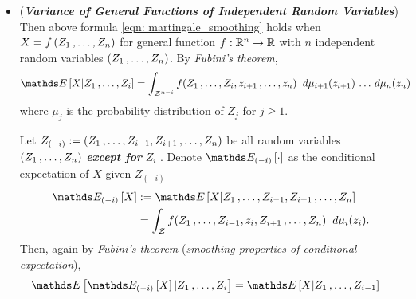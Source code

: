 \documentclass[11pt]{article}
\begin{document}
\begin{itemize}
\item \begin{remark}(\textbf{\emph{Variance of General Functions of Independent Random Variables}})\\
Then above formula \eqref{eqn: martingale_smoothing} holds when $X = f\left(Z_1 \,{,}\ldots{,}\, Z_n\right)$ for general function $f: {\mathbb R}^n \to {\mathbb R}$ with $n$ independent random variables $(Z_1 \,{,}\ldots{,}\, Z_n)$. By \emph{Fubini's theorem},
\begin{align*}
 \E{}{X | Z_1 \xdotx{,} Z_i} &= \int_{\cZ^{n-i}} f(Z_1 \xdotx{,} Z_i, z_{i+1} \xdotx{,} z_n) \;\;d\mu_{i+1}(z_{i+1})  \xdotx{} d\mu_{n}(z_{n})
\end{align*} where $\mu_j$ is the probability distribution of $Z_j$ for $j \ge 1$. 

Let $Z_{(-i)} := (Z_1 \,{,}\ldots{,}\, Z_{i-1}, Z_{i+1} \,{,}\ldots{,}\, Z_n)$ be all random variables $(Z_1 \,{,}\ldots{,}\, Z_n)$ \emph{\textbf{except for}} $Z_i$ . Denote $\E{(-i)}{\cdot}$ as the conditional expectation of $X$ given $Z_{(-i)}$
\begin{align*}
 \E{(-i)}{X} &:= \E{}{X | Z_1 \xdotx{,} Z_{i-1}, Z_{i+1} \xdotx{,} Z_n} \\
 &= \int_{\cZ} f(Z_1 \xdotx{,} Z_{i-1}, z_{i}, Z_{i+1} \xdotx{,} Z_n) \;\;d\mu_{i}(z_{i}).
\end{align*} Then, again by \emph{Fubini's theorem} (\emph{smoothing properties of conditional expectation}),
\begin{align}
\E{}{ \E{(-i)}{X} | Z_1 \xdotx{,} Z_i} &= \E{}{X | Z_1 \xdotx{,} Z_{i-1}} \label{eqn: martingale_smoothing_expectation}
\end{align} 
\end{remark}


\end{itemize}
\end{document}
